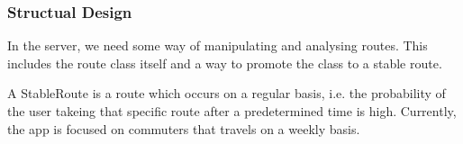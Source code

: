 \subsubsection{Structual Design}
In the server, we need some way of manipulating and analysing routes.
This includes the route class itself and a way to promote the class to a stable route.

A StableRoute is a route which occurs on a regular basis, i.e. the probability of the user takeing that specific route after a predetermined time is high.
Currently, the app is focused on commuters that travels on a weekly basis.

